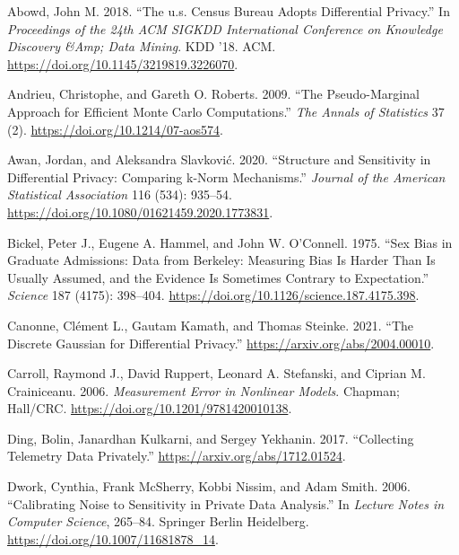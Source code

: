 \hypertarget{refs}{}
\begin{CSLReferences}{1}{0}
\leavevmode{}%
Abowd, John M. 2018. {``The u.s. Census Bureau Adopts Differential Privacy.''} In \emph{Proceedings of the 24th ACM SIGKDD International Conference on Knowledge Discovery \&Amp; Data Mining}. KDD '18. ACM. \url{https://doi.org/10.1145/3219819.3226070}.

\leavevmode{}%
Andrieu, Christophe, and Gareth O. Roberts. 2009. {``The Pseudo-Marginal Approach for Efficient Monte Carlo Computations.''} \emph{The Annals of Statistics} 37 (2). \url{https://doi.org/10.1214/07-aos574}.

\leavevmode{}%
Awan, Jordan, and Aleksandra Slavković. 2020. {``Structure and Sensitivity in Differential Privacy: Comparing k-Norm Mechanisms.''} \emph{Journal of the American Statistical Association} 116 (534): 935--54. \url{https://doi.org/10.1080/01621459.2020.1773831}.

\leavevmode{}%
Bickel, Peter J., Eugene A. Hammel, and John W. O'Connell. 1975. {``Sex Bias in Graduate Admissions: Data from Berkeley: Measuring Bias Is Harder Than Is Usually Assumed, and the Evidence Is Sometimes Contrary to Expectation.''} \emph{Science} 187 (4175): 398--404. \url{https://doi.org/10.1126/science.187.4175.398}.

\leavevmode{}%
Canonne, Clément L., Gautam Kamath, and Thomas Steinke. 2021. {``The Discrete Gaussian for Differential Privacy.''} \url{https://arxiv.org/abs/2004.00010}.

\leavevmode{}%
Carroll, Raymond J., David Ruppert, Leonard A. Stefanski, and Ciprian M. Crainiceanu. 2006. \emph{Measurement Error in Nonlinear Models}. Chapman; Hall/CRC. \url{https://doi.org/10.1201/9781420010138}.

\leavevmode{}%
Ding, Bolin, Janardhan Kulkarni, and Sergey Yekhanin. 2017. {``Collecting Telemetry Data Privately.''} \url{https://arxiv.org/abs/1712.01524}.

\leavevmode{}%
Dwork, Cynthia, Frank McSherry, Kobbi Nissim, and Adam Smith. 2006. {``Calibrating Noise to Sensitivity in Private Data Analysis.''} In \emph{Lecture Notes in Computer Science}, 265--84. Springer Berlin Heidelberg. \url{https://doi.org/10.1007/11681878_14}.


\end{CSLReferences}
